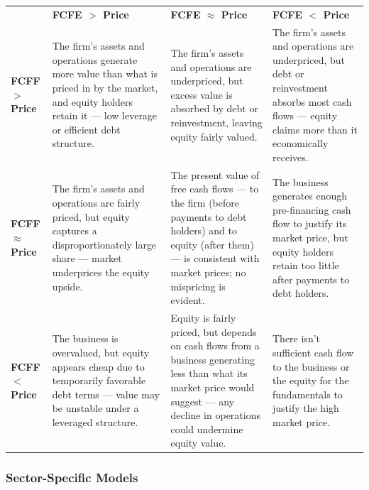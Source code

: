 \noindent
\begin{tabular}{>{\raggedright\arraybackslash}p{}
                >{\raggedright\arraybackslash}p{}
                >{\raggedright\arraybackslash}p{}
                >{\raggedright\arraybackslash}p{}}

\textbf{}
& \textbf{FCFE $>$ Price}
& \textbf{FCFE $\approx$ Price}
& \textbf{FCFE $<$ Price} \\

\textbf{FCFF $>$ Price}
& \signalstrongbuy{} The firm's assets and operations generate more value than what is priced in by the market, and equity holders retain it — low leverage or efficient debt structure.
& \signalbuy{} The firm's assets and operations are underpriced, but excess value is absorbed by debt or reinvestment, leaving equity fairly valued.
& \signalcaution{} The firm's assets and operations are underpriced, but debt or reinvestment absorbs most cash flows — equity claims more than it economically receives. \\

\textbf{FCFF $\approx$ Price}
& \signalbuy{} The firm's assets and operations are fairly priced, but equity captures a disproportionately large share — market underprices the equity upside.
& \signalhold{} The present value of free cash flows — to the firm (before payments to debt holders) and to equity (after them) — is consistent with market prices; no mispricing is evident.
& \signalspeculative{} The business generates enough pre-financing cash flow to justify its market price, but equity holders retain too little after payments to debt holders. \\

\textbf{FCFF $<$ Price}
& \signalcaution{} The business is overvalued, but equity appears cheap due to temporarily favorable debt terms — value may be unstable under a leveraged structure.
& \signalspeculative{} Equity is fairly priced, but depends on cash flows from a business generating less than what its market price would suggest — any decline in operations could undermine equity value.
& \signalavoid{} There isn't sufficient cash flow to the business or the equity for the fundamentals to justify the high market price. \\
\end{tabular}

\subsubsection{Sector-Specific Models}

